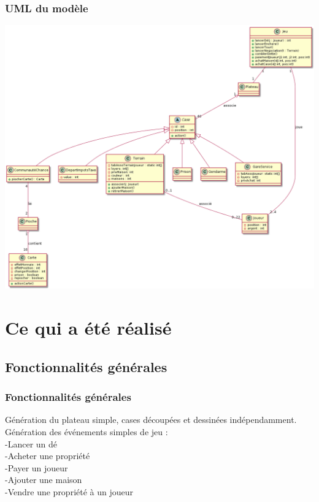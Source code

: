 \documentclass{beamer}
\begin{document}
\begin{darkframes}
 \begin{frame}
 	 \frametitle{UML du modèle}
 	 \includegraphics[scale=0.3]{./img/umlv2.png}
 \end{frame}
    
 \section{Ce qui a été réalisé}
	\subsection{Fonctionnalités générales} 	
 	\begin{frame}
 	 \frametitle{Fonctionnalités générales}
 	 
 	 
 	 	Génération du plateau simple, cases découpées et dessinées indépendamment.\\%
		Génération des événements simples de jeu :\\%
		-Lancer un dé\\%
		-Acheter une propriété\\%
		-Payer un joueur\\%
		-Ajouter une maison\\%
		-Vendre une propriété à un joueur\\%
 	 	
    \end{frame}
    

\end{darkframes}
\end{document}

